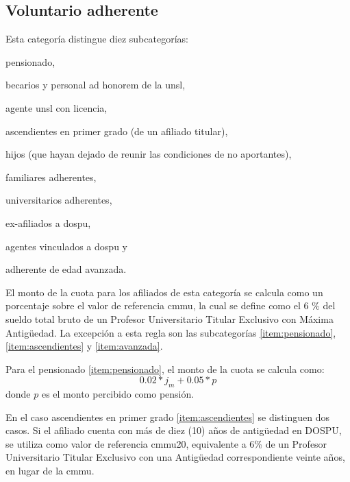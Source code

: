 \subsection{Voluntario adherente} \label{sec:adherente}

Esta categoría distingue diez subcategorías:
\begin{enumerate*}[label=(\alph*)]
    \item 
    \label{item:pensionado}
    pensionado, 
    \item becarios y personal ad honorem de la \acrshort{unsl}, 
    \item agente \acrshort{unsl} con licencia, 
    \item 
    \label{item:ascendientes}
    ascendientes en primer grado (de un afiliado titular), 
    \item hijos (que hayan dejado de reunir las condiciones de no aportantes), 
    \item familiares adherentes, 
    \item universitarios adherentes, 
    \item ex-afiliados a \acrshort{dospu}, 
    \item agentes vinculados a \acrshort{dospu} y 
    \item 
    \label{item:avanzada}
    adherente de edad avanzada.
\end{enumerate*} 

El monto de la cuota para los afiliados de esta categoría se calcula como un porcentaje sobre el valor de referencia \acrfull{cmmu}, la cual se define como el 6 \% del sueldo total bruto de un Profesor Universitario Titular Exclusivo con Máxima Antigüedad. %
La excepción a esta regla son las subcategorías \ref{item:pensionado}, \ref{item:ascendientes} y \ref{item:avanzada}.


Para el pensionado \ref{item:pensionado}, el monto de la cuota se calcula como:
\begin{displaymath}
0.02 * j_m + 0.05 * p
\end{displaymath}
donde $p$ es el monto percibido como pensión.

En el caso ascendientes en primer grado \ref{item:ascendientes} se distinguen dos casos.
Si el afiliado cuenta con más de diez (10) años de antigüedad en DOSPU, se utiliza como valor de referencia \acrshort{cmmu}20, equivalente a 6\% de un Profesor Universitario Titular Exclusivo con una Antigüedad correspondiente veinte años, en lugar de la \acrshort{cmmu}\cite{dospuRes60}.

